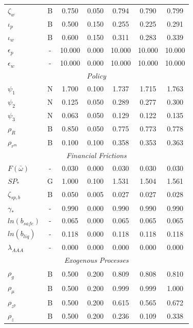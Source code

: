 \documentclass[12pt]{article}
\begin{document}
{\begin{longtable}{lcccccc}
$\zeta_w$ & B &    0.750 &    0.050 &    0.794 &    0.790 &    0.799 \\
$\iota_p$ & B &    0.500 &    0.150 &    0.255 &    0.225 &    0.291 \\
$\iota_w$ & B &    0.600 &    0.150 &    0.311 &    0.283 &    0.339 \\
$\epsilon_{p}$ & - &   10.000 &    0.000 &   10.000 &   10.000 &   10.000 \\
$\epsilon_{w}$ & - &   10.000 &    0.000 &   10.000 &   10.000 &   10.000 \\
\multicolumn{7}{c}{\textit{Policy}} \\[3pt]
$\psi_1$ & N &    1.700 &    0.100 &    1.737 &    1.715 &    1.763 \\
$\psi_2$ & N &    0.125 &    0.050 &    0.289 &    0.277 &    0.300 \\
$\psi_3$ & N &    0.063 &    0.050 &    0.129 &    0.122 &    0.135 \\
$\rho_R$ & B &    0.850 &    0.050 &    0.775 &    0.773 &    0.778 \\
$\rho_{r^m}$ & B &    0.100 &    0.100 &    0.358 &    0.353 &    0.363 \\
\multicolumn{7}{c}{\textit{Financial Frictions}} \\[3pt]
$F(\bar{\omega})$ & - &    0.030 &    0.000 &    0.030 &    0.030 &    0.030 \\
$SP_*$ & G &    1.000 &    0.100 &    1.531 &    1.504 &    1.561 \\
$\zeta_{sp,b}$ & B &    0.050 &    0.005 &    0.027 &    0.027 &    0.028 \\
$\gamma_*$ & - &    0.990 &    0.000 &    0.990 &    0.990 &    0.990 \\
$ln(b_{safe})$ & - &    0.065 &    0.000 &    0.065 &    0.065 &    0.065 \\
$ln(b_{liq})$ & - &    0.118 &    0.000 &    0.118 &    0.118 &    0.118 \\
$\lambda_{AAA}$ & - &    0.000 &    0.000 &    0.000 &    0.000 &    0.000 \\
\multicolumn{7}{c}{\textit{Exogenous Processes}} \\[3pt]
$\rho_g$ & B &    0.500 &    0.200 &    0.809 &    0.808 &    0.810 \\
$\rho_{\mu}$ & B &    0.500 &    0.200 &    0.999 &    0.999 &    1.000 \\
$\rho_{z^p}$ & B &    0.500 &    0.200 &    0.615 &    0.565 &    0.672 \\
$\rho_z$ & B &    0.500 &    0.200 &    0.236 &    0.109 &    0.338 \\

\end{longtable}}
\end{document}
